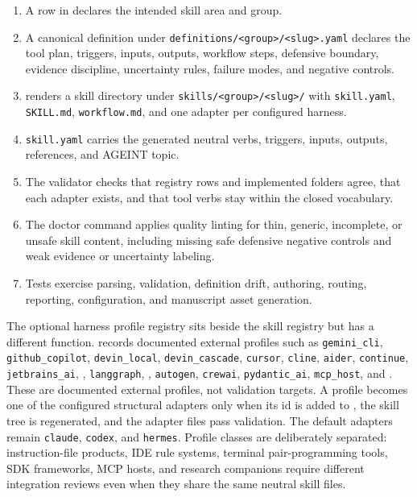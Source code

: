 \documentclass[
]{article}
\providecommand{\tightlist}{%
  \setlength{\itemsep}{0pt}\setlength{\parskip}{0pt}}
\begin{document}
\begin{enumerate}
\def\labelenumi{\arabic{enumi}.}
\tightlist
\item
  A row in  declares the intended skill
  area and group.
\item
  A canonical definition under
  \texttt{definitions/\textless{}group\textgreater{}/\textless{}slug\textgreater{}.yaml}
  declares the tool plan, triggers, inputs, outputs, workflow steps,
  defensive boundary, evidence discipline, uncertainty rules, failure
  modes, and negative controls.
\item
   renders a skill directory under
  \texttt{skills/\textless{}group\textgreater{}/\textless{}slug\textgreater{}/}
  with \texttt{skill.yaml}, \texttt{SKILL.md}, \texttt{workflow.md}, and
  one adapter per configured harness.
\item
  \texttt{skill.yaml} carries the generated neutral verbs, triggers,
  inputs, outputs, references, and AGEINT topic.
\item
  The validator checks that registry rows and implemented folders agree,
  that each adapter exists, and that tool verbs stay within the closed
  vocabulary.
\item
  The doctor command applies quality linting for thin, generic,
  incomplete, or unsafe skill content, including missing safe defensive
  negative controls and weak evidence or uncertainty labeling.
\item
  Tests exercise parsing, validation, definition drift, authoring,
  routing, reporting, configuration, and manuscript asset generation.
\end{enumerate}

The optional harness profile registry sits beside the skill registry but
has a different function. 
records documented external profiles such as \texttt{gemini\_cli},
\texttt{github\_copilot}, \texttt{devin\_local},
\texttt{devin\_cascade}, \texttt{cursor}, \texttt{cline},
\texttt{aider}, \texttt{continue}, \texttt{jetbrains\_ai},
, \texttt{langgraph},
, \texttt{autogen}, \texttt{crewai},
\texttt{pydantic\_ai}, \texttt{mcp\_host}, and
. These are documented external profiles,
not validation targets. A profile becomes one of the configured
structural adapters only when its id is added to
, the skill tree is regenerated, and the
adapter files pass validation. The default adapters remain
\texttt{claude}, \texttt{codex}, and \texttt{hermes}. Profile classes
are deliberately separated: instruction-file products, IDE rule systems,
terminal pair-programming tools, SDK frameworks, MCP hosts, and research
companions require different integration reviews even when they share
the same neutral skill files.
\end{document}
